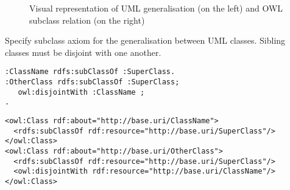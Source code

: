 \begin{figure}[!ht]
	\centering
	\begin{subfigure}{.5\textwidth}
		\centering
	\end{subfigure}%
	\begin{subfigure}{.5\textwidth}
		\centering
	\end{subfigure}
	\caption{Visual representation of UML generalisation (on the left) and OWL subclass relation (on the right)}
	\label{fig:generalisation-visual}
\end{figure}

\begin{trule}
	\label{rule:generalisation-class-core}
	Specify subclass axiom for the generalisation between UML classes. Sibling classes must be disjoint with one another. 
\end{trule}

\vspace{-\parskip}
\begin{minipage}[b]{.385\textwidth}
\begin{lstlisting}[language=Turtle, caption={Sub-classification in Turtle syntax}, captionpos=b]
:ClassName rdfs:subClassOf :SuperClass.
:OtherClass rdfs:subClassOf :SuperClass;
   owl:disjointWith :ClassName ;
.
\end{lstlisting}
\end{minipage}%
\quad\vspace{-\parskip}
\begin{minipage}[b]{.56\textwidth}
\begin{lstlisting}[language=RDF/XML, caption={Sub-classification in RDF/XML syntax}, captionpos=b]
<owl:Class rdf:about="http://base.uri/ClassName">
  <rdfs:subClassOf rdf:resource="http://base.uri/SuperClass"/>
</owl:Class>
<owl:Class rdf:about="http://base.uri/OtherClass">
  <rdfs:subClassOf rdf:resource="http://base.uri/SuperClass"/>
  <owl:disjointWith rdf:resource="http://base.uri/ClassName"/>
</owl:Class>
\end{lstlisting}
\end{minipage}
\vspace{-\parskip}

